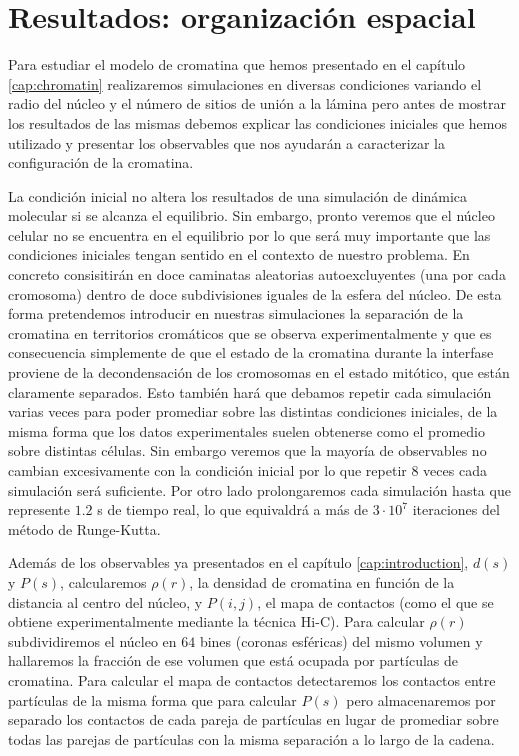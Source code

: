 \chapter{Resultados: organización espacial}
\label{cap:results}

Para estudiar el modelo de cromatina que hemos presentado en el capítulo \ref{cap:chromatin} realizaremos simulaciones en diversas condiciones variando el radio del núcleo y el número de sitios de unión a la lámina pero antes de mostrar los resultados de las mismas debemos explicar las condiciones iniciales que hemos utilizado y presentar los observables que nos ayudarán a caracterizar la configuración de la cromatina.

La condición inicial no altera los resultados de una simulación de dinámica molecular si se alcanza el equilibrio. Sin embargo, pronto veremos que el núcleo celular no se encuentra en el equilibrio por lo que será muy importante que las condiciones iniciales tengan sentido en el contexto de nuestro problema. En concreto consisitirán en doce caminatas aleatorias autoexcluyentes (una por cada cromosoma) dentro de doce subdivisiones iguales de la esfera del núcleo. De esta forma pretendemos introducir en nuestras simulaciones la separación de la cromatina en territorios cromáticos que se observa experimentalmente y que es consecuencia simplemente de que el estado de la cromatina durante la interfase proviene de la decondensación de los cromosomas en el estado mitótico, que están claramente separados. Esto también hará que debamos repetir cada simulación varias veces para poder promediar sobre las distintas condiciones iniciales, de la misma forma que los datos experimentales suelen obtenerse como el promedio sobre distintas células. Sin embargo veremos que la mayoría de observables no cambian excesivamente con la condición inicial por lo que repetir $8$ veces cada simulación será suficiente. Por otro lado prolongaremos cada simulación hasta que represente $1.2$ s de tiempo real, lo que equivaldrá a más de $3\cdot10^7$ iteraciones del método de Runge-Kutta.

Además de los observables ya presentados en el capítulo \ref{cap:introduction}, $d(s)$ y $P(s)$, calcularemos $\rho(r)$, la densidad de cromatina en función de la distancia al centro del núcleo, y $P(i,j)$, el mapa de contactos (como el que se obtiene experimentalmente mediante la técnica Hi-C). Para calcular $\rho(r)$ subdividiremos el núcleo en $64$ bines (coronas esféricas) del mismo volumen y hallaremos la fracción de ese volumen que está ocupada por partículas de cromatina. Para calcular el mapa de contactos detectaremos los contactos entre partículas de la misma forma que para calcular $P(s)$ pero almacenaremos por separado los contactos de cada pareja de partículas en lugar de promediar sobre todas las parejas de partículas con la misma separación a lo largo de la cadena.

